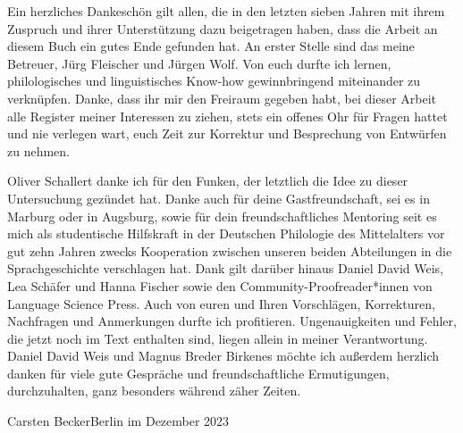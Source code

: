 Ein herzliches Dankeschön gilt allen, die in den letzten sieben Jahren mit
ihrem Zuspruch und ihrer Unterstützung dazu beigetragen haben, dass die Arbeit
an diesem Buch ein gutes Ende gefunden hat. An erster Stelle sind das meine
Betreuer, Jürg Fleischer und Jürgen Wolf. Von euch durfte ich lernen,
philologisches und linguistisches Know-how gewinnbringend miteinander zu
verknüpfen. Danke, dass ihr mir den Freiraum gegeben habt, bei dieser Arbeit
alle Register meiner Interessen zu ziehen, stets ein offenes Ohr für Fragen
hattet und nie verlegen wart, euch Zeit zur Korrektur und Besprechung von
Entwürfen zu nehmen.

Oliver Schallert danke ich für den Funken, der letztlich die Idee zu dieser
Untersuchung gezündet hat. Danke auch für deine Gastfreundschaft, sei es in
Marburg oder in Augsburg, sowie für dein freundschaftliches Mentoring seit es
mich als studentische Hilfskraft in der Deutschen Philologie des Mittelalters
vor gut zehn Jahren zwecks Kooperation zwischen unseren beiden Abteilungen in
die Sprachgeschichte verschlagen hat. Dank gilt darüber hinaus Daniel David
Weis, Lea Schäfer und Hanna Fischer sowie den Community-Proofreader*innen von
Language Science Press. Auch von euren und Ihren Vorschlägen, Korrekturen,
Nachfragen und Anmerkungen durfte ich profitieren. Ungenauigkeiten und Fehler,
die jetzt noch im Text enthalten sind, liegen allein in meiner Verantwortung.
Daniel David Weis und Magnus Breder Birkenes möchte ich außerdem herzlich
danken für viele gute Gespräche und freundschaftliche Ermutigungen,
durchzuhalten, ganz besonders während zäher Zeiten.
\bigskip

\noindent%
Carsten Becker\hfill Berlin im Dezember 2023
